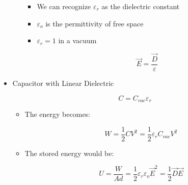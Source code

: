\begin{itemize}
\begin{itemize}
        \begin{itemize}

          \item We can recognize $\varepsilon_r$ as the dielectric constant

          \item $\varepsilon_o$ is the permittivity of free space

          \item $\varepsilon_r=1$ in a vacuum

            $$\vec{E}=\frac{\vec{D}}{\varepsilon}$$

        \end{itemize}

    \end{itemize}

  \item Capacitor with Linear Dielectric

    $$C=C_{vac}\varepsilon_r$$

    \begin{itemize}

      \item The energy becomes:

        $$W=\frac{1}{2}CV^2=\frac{1}{2}\varepsilon_rC_{vac}V^2$$

      \item The stored energy would be:

        $$U=\frac{W}{Ad}=\frac{1}{2}\varepsilon_r\varepsilon_o\vec{E}^2=\frac{1}{2}\vec{D}\vec{E}$$

    \end{itemize}

\end{itemize}



